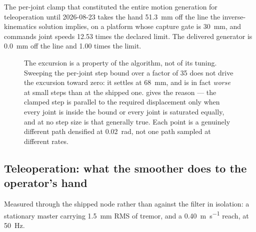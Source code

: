 The per-joint clamp that constituted the entire motion generation for
teleoperation until 2026-08-23 takes the hand
\SI{51.3}{\milli\metre} off the line the inverse-kinematics solution implies,
on a platform whose capture gate is \SI{30}{\milli\metre}, and commands joint
speeds \num{12.53} times the declared limit. The delivered generator is
\SI{0.0}{\milli\metre} off the line and \num{1.00} times the limit.

\begin{figure}[htbp]
  \centering
  
  \caption[The clamp against its own step size]{The excursion is a property
  of the algorithm, not of its tuning. Sweeping the per-joint step bound over
  a factor of \num{35} does not drive the excursion toward zero: it settles
  at \SI{68}{\milli\metre}, and is in fact \emph{worse} at small steps than
  at the shipped one.  gives the reason --- the clamped
  step is parallel to the required displacement only when every joint is
  inside the bound or every joint is saturated equally, and at no step size
  is that generally true. Each point is a genuinely different path densified
  at \SI{0.02}{\radian}, not one path sampled at different rates.}
  \label{fig:sim-stepsweep}
\end{figure}

\subsection{Teleoperation: what the smoother does to the operator's hand}
\label{sec:sim-smoothing}

Measured through the shipped node rather than against the filter in
isolation: a stationary master carrying \SI{1.5}{\milli\metre} RMS of tremor,
and a \SI{0.40}{\metre\per\second} reach, at \SI{50}{\hertz}.

\begin{table}[htbp]
  \centering
  \small
  \caption[Master smoothing]{Stillness and lag, measured together. They are
  the pair a fixed coefficient cannot win: the tremor is high frequency at
  low amplitude and the motion is low frequency at high amplitude, so any
  single cutoff trades one against the other. The fixed exponential average
  the node ran until 2026-08-27 buys
  \SI{1.5}{\milli\metre} of stillness for \SI{18.7}{\milli\metre} of lag ---
  more than half the capture gate, spent on a hand that is simply moving.}
  \label{tab:sim-smoothing}
  
\end{table}

